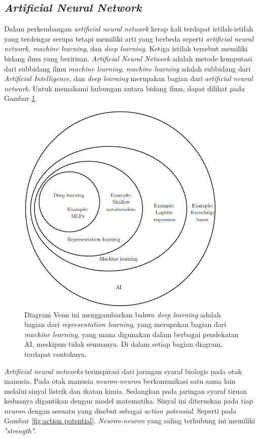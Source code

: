 \subsection{\textit{Artificial Neural Network}}
Dalam perkembangan \textit{artificial neural network} kerap kali terdapat istilah-istilah yang terdengar serupa tetapi memiliki arti yang berbeda seperti \textit{artificial neural network, machine learning}, dan \textit{deep learning}. Ketiga istilah tersebut memiliki bidang ilmu yang beririsan. \textit{Artificial Neural Network} adalah metode komputasi dari subbidang ilmu \textit{machine learning}, \textit{machine learning} adalah subbidang dari \textit{Artificial Intelligence}, dan \textit{deep learning} merupakan bagian dari \textit{artificial neural network}. Untuk memahami hubungan antara bidang ilmu, dapat dilihat pada Gambar \ref{fig:diagram_venn}.

\begin{figure}[H]
    \centering
    \includegraphics[width = 10cm]{contents/chapter-2/diagram_venn.png}
    \caption{Diagram Venn ini menggambarkan bahwa \textit{deep learning} adalah bagian dari \textit{representation learning}, yang merupakan bagian dari \textit{machine learning}, yang mana digunakan dalam berbagai pendekatan AI, meskipun tidak semuanya. Di dalam setiap bagian diagram, terdapat contohnya.\cite{GoodBengCour16}}
    \label{fig:diagram_venn}
\end{figure}

\textit{Artificial neural networks} terinspirasi dari jaringan syaraf biologis pada otak manusia\cite{Kelleher2019-cj}. Pada otak manusia \textit{neuron-neuron} berkomunikasi satu sama lain melalui sinyal listrik dan ikatan kimia. Sedangkan pada jaringan syaraf tiruan keduanya digantikan dengan model matematika. Sinyal ini diteruskan pada tiap \textit{neuron} dengan sesuatu yang disebut sebagai \textit{action potensial}. Seperti pada Gambar \ref{fig:action potential}. \textit{Neuron-neuron} yang saling terhubung ini memiliki \textit{"strength"}.

